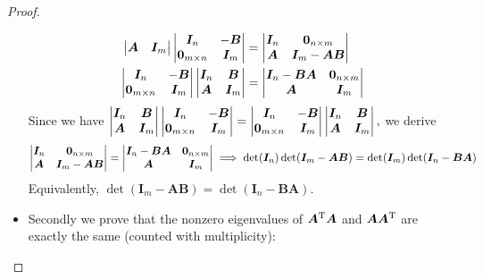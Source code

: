 \begin{proof}
\begin{itemize}
\begin{align}
\begin{vmatrix}
\bm A&\bm I_m
\end{vmatrix}\begin{vmatrix}
\bm I_n&-\bm B\\
\bm 0_{m\times n}&\bm I_m
\end{vmatrix}
&=\begin{vmatrix}
\bm I_n&\bm 0_{n\times m}\\
\bm A&\bm I_m-\bm{AB}
\end{vmatrix}\\
\begin{vmatrix}
\bm I_n&-\bm B\\
\bm 0_{m\times n}&\bm I_m
\end{vmatrix}
\begin{vmatrix}
\bm I_n&\bm B\\
\bm A&\bm I_m
\end{vmatrix}
&=\begin{vmatrix}
\bm I_n-\bm{BA}&\bm 0_{n\times m}\\
\bm A&\bm I_m
\end{vmatrix}
\end{align}
Since we have $\begin{vmatrix}
\bm I_n&\bm B\\
\bm A&\bm I_m
\end{vmatrix}\begin{vmatrix}
\bm I_n&-\bm B\\
\bm 0_{m\times n}&\bm I_m
\end{vmatrix}=\begin{vmatrix}
\bm I_n&-\bm B\\
\bm 0_{m\times n}&\bm I_m
\end{vmatrix}
\begin{vmatrix}
\bm I_n&\bm B\\
\bm A&\bm I_m
\end{vmatrix},$ we derive
\[
\begin{vmatrix}
\bm I_n&\bm 0_{n\times m}\\
\bm A&\bm I_m-\bm{AB}
\end{vmatrix}=\begin{vmatrix}
\bm I_n-\bm{BA}&\bm 0_{n\times m}\\
\bm A&\bm I_m
\end{vmatrix}
\implies
\det(\bm I_n)\det(\bm I_m-\bm{AB})=\det(\bm I_m)\det(\bm I_n-\bm{BA})
\]
Equivalently, $\det(\bm I_m-\bm{AB})=\det(\bm I_n-\bm{BA}).$
\item
Secondly we prove that the nonzero eigenvalues of $\bm A^{\mathrm T}\bm A$ and $\bm A\bm A^{\mathrm T}$ are exactly the same (counted with multiplicity):\\

\end{itemize}
\end{proof}
